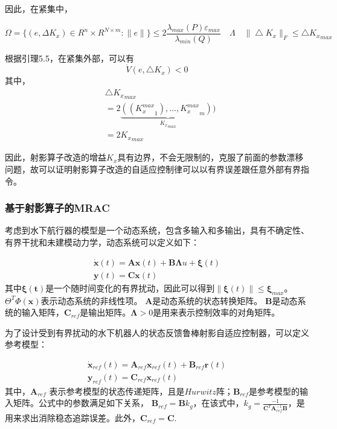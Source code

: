 因此，在紧集中，

\begin{equation}
\Omega = \{(e,\Delta K_x) \in R^n \times R^{N \times m}: \|e \| \} \leq 2\frac{\lambda_{max}(P) \varepsilon_{max}}{\lambda_{min}(Q)} \quad \Lambda \quad  \| \bigtriangleup K_x \|_F \leq \bigtriangleup {K_x}_{max}
\end{equation}

根据引理5.5，在紧集外部，可以有
\begin{equation}
\dot  V (e, \bigtriangleup K_x) < 0
\end{equation}
其中，
\begin{equation}
\begin{aligned}
&\bigtriangleup {K_x}_{max} \\
&= 2\underbrace{(({K_x^{max}}_1) ,..., {K_x^{max}}_{m}))}_{{K_x}_{max}}\\
& = 2 {K_x}_{max}
\end{aligned}
\end{equation}

因此，射影算子改造的增益$K_x$具有边界，不会无限制的，克服了前面的参数漂移问题，故可以证明射影算子改造的自适应控制律可以以有界误差跟任意外部有界指令。



\subsubsection{基于射影算子的MRAC }

考虑到水下航行器的模型是一个动态系统，包含多输入和多输出，具有不确定性、有界干扰和未建模动力学，动态系统可以定义如下：

\begin{equation}
\label{eq012}
\begin{array}{l}
\dot{\bm{x}}(t) = \bm{A} \bm{x}(t)+ \bm{B} \bm{\Lambda}u + \bm{\xi} (t)\\
\bm{y}(t) = \bm{C}\bm{x} (t)
\end{array}
\end{equation}
其中$\bm{\xi(t)}$是一个随时间变化的有界扰动，因此可以得到$\left \| \bm{\xi}(t) \right \| \leq \bm{\xi}_{max}$。 $\Theta ^{T}\Phi (\bm{x})$表示动态系统的非线性项。 $\bm{A}$是动态系统的状态转换矩阵。 $\bm{B}$是动态系统的输入矩阵，$\bm{C}_{ref}$是输出矩阵。$\bm{\Lambda} > 0$是用来表示控制效率的对角矩阵。

为了设计受到有界扰动的水下机器人的状态反馈鲁棒射影自适应控制器，可以定义参考模型：

\begin{equation}
\label{eq013}
\begin{array}{l}
\bm{\dot x}_{ref} (t)= \bm{A}_{ref}\bm{x}_{ref}(t)+\bm{B}_{ref}\bm{r}(t) \\
\bm{y}_{ref}(t) = \bm{C}_{ref}\bm{x}_{ref}(t)
\end{array}
\end{equation}
其中，$\bm{A}_{ref}$ 表示参考模型的状态传递矩阵，且是$Hurwitz$阵；$\bm{B}_{ref}$是参考模型的输入矩阵。公式中的参数满足如下关系，
$\bm{B}_{ref} = \bm{B}k_g$，在该式中，$k_g = {}\frac{-1}{\bm{C}^T \bm{A}_{ref}^{-1} \bm{B}}$，是用来求出消除稳态追踪误差。此外，$\bm{C}_{ref} = \bm{C}$.

